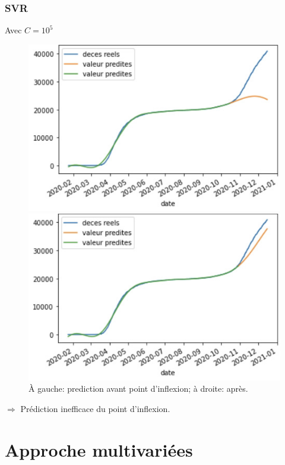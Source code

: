 \documentclass{beamer}
\begin{document}
\begin{frame}
	\frametitle{SVR}
	Avec $C=10^{5}$
	\begin{figure}[t]
		\centering
		\begin{minipage}{0.4\textwidth}
			\includegraphics[scale=0.26]{SVR_avant_pt_dinflexion}
		\end{minipage}
		\begin{minipage}{0.4\textwidth}
			\includegraphics[scale=0.26]{SVR_apres_pt_dinflexion}
		\end{minipage}
	\caption{À gauche: prediction avant point d'inflexion; à droite: après.}
	\end{figure}
	$\Rightarrow$ Prédiction inefficace du point d'inflexion.
\end{frame}

\section{Approche multivariées}
\end{document}

